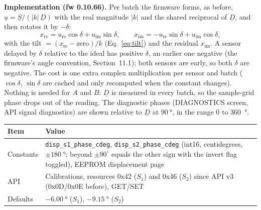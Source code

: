 \documentclass[11pt,a4paper]{article}
\begin{document}
\textbf{Implementation (fw 0.10.66).}  Per batch the firmware forms, as before,
$\underline{u}=\underline{S}/(|k|\,\underline{D})$ with the real magnitude
$|k|$ and the shared reciprocal of $\underline{D}$, and then rotates it by
$-\delta$:
\begin{equation}
  x_{\mathrm{re}} = u_{\mathrm{re}}\cos\delta + u_{\mathrm{im}}\sin\delta,\qquad
  x_{\mathrm{im}} = -u_{\mathrm{re}}\sin\delta + u_{\mathrm{im}}\cos\delta ,
\end{equation}
with the tilt $=(x_{\mathrm{re}}-\text{zero})/k$ (Eq.~\eqref{eq:tilt}) and the residual
$x_{\mathrm{im}}$.  A sensor delayed by $\delta$ relative to the ideal has
positive $\delta$, an earlier one negative (the firmware's angle convention,
Section~11.1); both sensors are early, so both $\delta$ are negative.  The
cost is one extra complex multiplication per sensor and batch
($\cos\delta$, $\sin\delta$ are cached and only recomputed when the constant
changes).  Nothing is needed for $A$ and $B$: $\underline{D}$ is measured in
every batch, so the sample-grid phase drops out of the reading.  The
diagnostic phases (DIAGNOSTICS screen, API signal diagnostics) are shown
relative to $\underline{D}$ at $\SI{90}{\degree}$, in the range 0 to
\SI{360}{\degree}.

\begin{center}
\small
\begin{tabular}{@{}p{}p{}@{}}
\toprule
Item & Value \\
\midrule
Constants & \texttt{disp\_s1\_phase\_cdeg}, \texttt{disp\_s2\_phase\_cdeg} (int16,
  centidegrees, $\pm\SI{180}{\degree}$; beyond $\pm90^{\circ}$ equals the other sign with the invert flag toggled), EEPROM displacement page \\
API & Calibrations, resources 0x42 ($S_1$) and 0x46 ($S_2$) since API v3 (0x0D/0x0E before), GET/SET \\
Defaults & $-\SI{6.00}{\degree}$ ($S_1$), $-\SI{9.15}{\degree}$ ($S_2$) \\
\bottomrule
\end{tabular}
\end{center}
\end{document}
